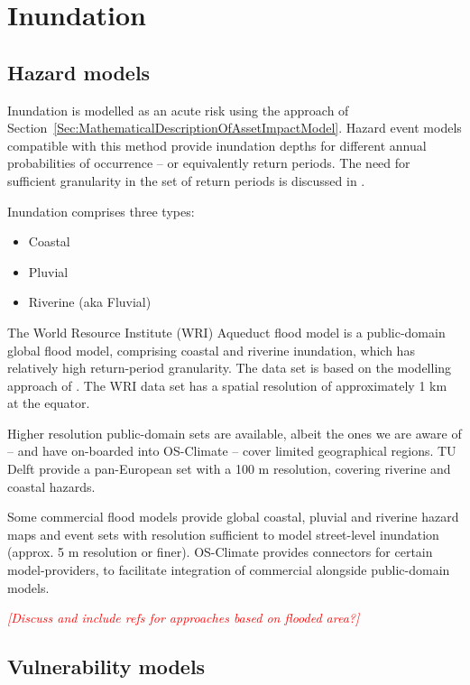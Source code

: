 \documentclass[a4paper,11pt]{extarticle} %
\theoremstyle{definition}
\begin{document}
\section{Inundation}
\subsection{Hazard models}
Inundation is modelled as an acute risk using the approach of Section~\ref{Sec:MathematicalDescriptionOfAssetImpactModel}. Hazard event models compatible with this method provide inundation depths for different annual probabilities of occurrence -- or equivalently return periods. The need for sufficient granularity in the set of return periods is discussed in \cite{WardEtAl:2011}.

Inundation comprises three types:
\begin{itemize}
\item Coastal 
\item Pluvial
\item Riverine (aka Fluvial)
\end{itemize}

The World Resource Institute (WRI) Aqueduct flood model \cite{WardEtAl:2020} is a public-domain global flood model, comprising coastal and riverine inundation, which has relatively high return-period granularity. The data set is based on the modelling approach of \cite{WardEtAl:2013}. The WRI data set has a spatial resolution of approximately 1 km at the equator.

Higher resolution public-domain sets are available, albeit the ones we are aware of -- and have on-boarded into OS-Climate -- cover limited geographical regions. TU Delft provide a pan-European set \cite{PaprotnyEtAl:2016} with a 100 m resolution, covering riverine and coastal hazards.

Some commercial flood models provide global coastal, pluvial and riverine hazard maps and event sets with resolution sufficient to model street-level inundation (approx. 5 m resolution or finer). OS-Climate provides connectors for certain model-providers, to facilitate integration of commercial alongside public-domain models.

{\textcolor{red}{\emph{[Discuss and include refs for approaches based on flooded area?]}}}

\subsection{Vulnerability models}
\end{document}
